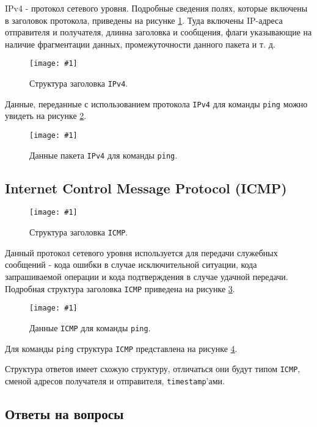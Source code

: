 \documentclass[12pt, a4paper]{article}
\newcommand{\figc}[4]{
  \begin{figure}[h]
  \begin{center}
    \texttt{[image: \#1]}
    \caption{#2}
    \label{fig:#3}
  \end{center}
  \end{figure}
}
\begin{document}
IPv4 - протокол сетевого уровня. Подробные сведения полях, которые включены в заголовок
протокола, приведены на рисунке \ref{fig:ipv4_h}. Туда включены IP-адреса
отправителя и получателя, длинна заголовка и сообщения, флаги указывающие на
наличие фрагментации данных, промежуточности данного пакета и т. д.

\figc{ipv4_header}{Структура заголовка \texttt{IPv4}.}{ipv4_h}{1.4}

Данные, переданные с использованием протокола \texttt{IPv4} для команды
\texttt{ping} можно увидеть на рисунке \ref{fig:p_ip}.

\newpage

\figc{ping_ipv4}{Данные пакета \texttt{IPv4} для команды \texttt{ping}.}{p_ip}{3.0}

\subsection{Internet Control Message Protocol (ICMP)}

\figc{icmp_header}{Структура заголовка \texttt{ICMP}.}{icmp_h}{1.4}

Данный протокол сетевого уровня используется для передачи служебных сообщений -
кода ошибки в случае исключительной ситуации, кода запрашиваемой операции и
кода подтверждения в случае удачной передачи. Подробная структура заголовка
\texttt{ICMP} приведена на рисунке \ref{fig:icmp_h}.

\figc{ping_icmp}{Данные \texttt{ICMP} для команды \texttt{ping}.}{ping_icmp}{3.0}

Для команды \texttt{ping} структура \texttt{ICMP} представлена на рисунке
\ref{fig:ping_icmp}.

Структура ответов имеет схожую структуру, отличаться они будут типом \texttt{ICMP},
сменой адресов получателя и отправителя, \texttt{timestamp}'ами.

\subsection{Ответы на вопросы}
\end{document}
